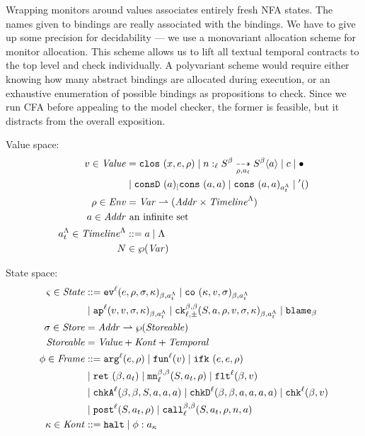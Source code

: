 \documentclass[preprint,onecolumn,9pt]{sigplanconf} %
\begin{document}
Wrapping monitors around values associates entirely fresh NFA
states. The names given to bindings are really associated with the
bindings. We have to give up some precision for decidability --- we
use a monovariant allocation scheme for monitor allocation. This
scheme allows us to lift all textual temporal contracts to the top
level and check individually. A polyvariant scheme would require
either knowing how many abstract bindings are allocated during
execution, or an exhaustive enumeration of possible bindings as
propositions to check. Since we run CFA before appealing to the model
checker, the former is feasible, but it distracts from the overall
exposition.

Value space:
\begin{align*}
  \mval \in \Value &=
    \clos{\mvar, \mexp, \menv}
   \alt \blclos{\mname}{\mmlab}{\mmlab}{\mlab}{\mscon}{\mscon}{\menv}{\mtimeline}{\maddr}
   \alt \mconstant
   \alt \blackhole \\
&  \alt \vconsf{\maddr}
   \alt \vcons{\maddr}{\maddr}
   \alt \vconst{\maddr}{\maddr}{\mstimeline}
   \alt \sunit \\
  \menv \in \Env &= \Var \parto (\Addr \times \Timeline^{\toplevel}) \\
  \maddr \in \Addr &\text{ an infinite set} \\
  \mstimeline \in \Timeline^{\toplevel} &::= \maddr \alt \toplevel \\
  \mnames &\in \wp(\Var) \\
\end{align*}

State space:
\begin{align*}
  \mstate \in \State &::=
      \ev[^\mlab]{\mexp, \menv, \msto, \mkont}{\msmlab}{\mstimeline}
 \alt \co{\mkont, \mval, \msto}{\msmlab}{\mstimeline} \\
&\alt \ap[^\mlab]{\mval, \mval, \msto, \mkont}{\msmlab}{\mstimeline}
 \alt \ck{\mmlab}{\mmlab}{\mlab}{\pm}{\mscon, \maddr, \menv, \mval, \msto, \mkont}{\msmlab}{\mstimeline}
 \alt \sblame{\mmlab} \\
\msto \in \Store &= \Addr \parto \wp(\Storeable) \\
\Storeable &= \Value + \Kont + \TContract \\
\mframe \in \Frame &::=
      \kar[^\mlab]{\mexp,\menv}
 \alt \kfn[^\mlab]{\mval}
 \alt \kif{\mexp, \mexp, \menv} \\
&\alt \krt{\mmlab, \mtimeline}
 \alt \kmon{\mmlab}{\mmlab}{\mlab}{\mscon, \mtimeline, \menv}
 \alt \kflat[^\mlab]{\mmlab, \mval} \\
&\alt \kchkA[^\mlab]{\mmlab, \mmlab, \mscon, \maddr, \maddr, \maddr}
 \alt \kchkD[^\mlab]{\mmlab, \mmlab, \maddr, \maddr, \maddr, \maddr}
 \alt \kcheck[^\mlab]{\mmlab, \mval} \\
&\alt \kpost[^\mlab]{\mscon, \mtimeline, \menv}
 \alt \kmcall{\mmlab}{\mmlab}{\mlab}{\mscon, \mtimeline, \menv, \mname, \maddr} \\
\mkont \in \Kont &::= \kmt \alt \spush{\mframe}{\mkaddr}
\end{align*}
\end{document}
